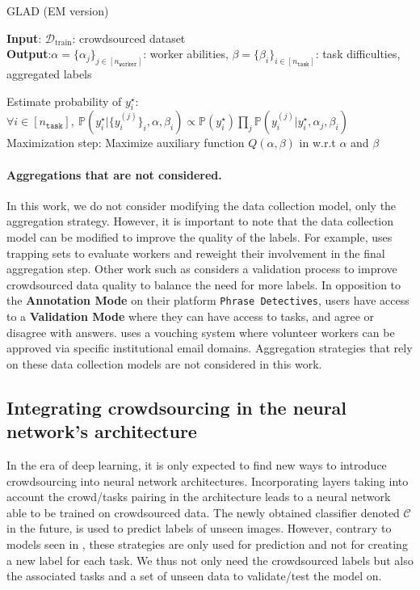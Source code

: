 \begin{algorithm}[tb]
   \caption{$\mathrm{GLAD}$ (EM version)}\label{ag:GLAD}
\textbf{Input}: $\mathcal{D}_{\text{train}}$: crowdsourced dataset \\
\textbf{Output}:$\alpha=\{\alpha_j\}_{j\in [n_\texttt{worker}]}$: worker abilities, $\beta=\{\beta_i\}_{i\in [n_\texttt{task}]}$: task difficulties, aggregated labels
\begin{algorithmic}[1]
    \STATE Estimate probability of $y_i^\star$:
    \STATE $\forall i \in [n_{\texttt{task}}],\ \mathbb{P}(y_i^\star|\{y_i^{(j)}\}_{i},\alpha,\beta_i)\propto \mathbb{P}(y_i^\star)\prod_j \mathbb{P}(y_i^{(j)}|y_i^\star,\alpha_j,\beta_i)$
    \STATE Maximization step:
    \STATE Maximize auxiliary function $Q(\alpha,\beta)$ in  w.r.t $\alpha$ and $\beta$
\ENDWHILE
\end{algorithmic}
\end{algorithm}

\paragraph*{Aggregations that are not considered.}
In this work, we do not consider modifying the data collection model, only the aggregation strategy.
However, it is important to note that the data collection model can be modified to improve the quality of the labels.
For example, \citet{khattak_toward_2017} uses trapping sets to evaluate workers and reweight their involvement in the final aggregation step.
Other work such as \citet{chamberlain2018optimising} considers a validation process to improve crowdsourced data quality to balance the need for more labels. In opposition to the \textbf{Annotation Mode} on their platform \texttt{Phrase Detectives}, users have access to a \textbf{Validation Mode} where they can have access to tasks, and agree or disagree with answers.
\citet{hoang2021tournesol} uses a vouching system where volunteer workers can be approved via specific institutional email domains.
Aggregation strategies that rely on these data collection models are not considered in this work.

\subsection{Integrating crowdsourcing in the neural network's architecture}
In the era of deep learning, it is only expected to find new ways to introduce crowdsourcing into neural network architectures.
Incorporating layers taking into account the crowd/tasks pairing in the architecture leads to a neural network able to be trained on crowdsourced data.
The newly obtained classifier denoted $\mathcal{C}$ in the future, is used to predict labels of unseen images.
However, contrary to models seen in , these strategies are only used for prediction and not for creating a new label for each task.
We thus not only need the crowdsourced labels but also the associated tasks and a set of unseen data to validate/test the model on.

